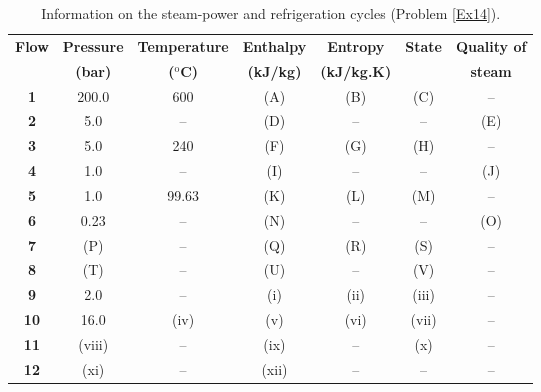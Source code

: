 \begin{enumerate}
\begin{table}[h]
\begin{center}
\begin{tabular}{ || c || c | c | c | c | c || c ||}
\hline\hline
{\bf Flow}& {\bf Pressure}  &  {\bf Temperature}   &  {\bf Enthalpy}  & {\bf Entropy}     & {\bf State}  & {\bf Quality of} \\
          & {\bf (bar)}     & {\bf ($^{\text{o}}$C)} &  {\bf (kJ/kg)}   &  {\bf (kJ/kg.K)}  &              & {\bf steam}      \\
\hline\hline
{\bf 1}   &   200.0         &      600         &      (A)          &      (B)             & (C)          &  --              \\
{\bf 2}   &   5.0           &       --         &      (D)          &      --              & --           &  (E)             \\
{\bf 3}   &   5.0           &      240         &      (F)          &      (G)             & (H)          &  --              \\
{\bf 4}   &   1.0           &      --          &      (I)          &      --              & --           &  (J)             \\ 
{\bf 5}   &   1.0           &    99.63         &      (K)          &     (L)              &  (M)         &   --             \\ 
{\bf 6}   &   0.23          &      --          &      (N)          &     --               &  --          &  (O)             \\
{\bf 7}   &   (P)           &      --          &      (Q)          &      (R)             &  (S)         &   --             \\              
{\bf 8}   &   (T)           &      --          &      (U)          &       --             & (V)          & --               \\
\hline \hline
{\bf 9}   &   2.0           &      --          &      (i)          &      (ii)            &  (iii)       &  --              \\
{\bf 10}  &  16.0           &     (iv)         &      (v)          &      (vi)            &   (vii)      &   --             \\ 
{\bf 11}  &  (viii)         &     --           &      (ix)         &      --              &  (x)         &   --             \\
{\bf 12}  &   (xi)          &    --            &     (xii)         &      --              &   --         &    --            \\ 
\hline\hline
\end{tabular}
\end{center}
\caption{Information on the steam-power and refrigeration cycles (Problem \ref{Ex14}).}\label{Ex14:Tab1}
\end{table}


\end{enumerate}
